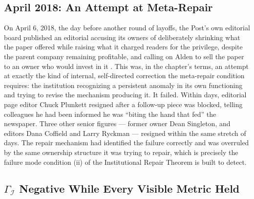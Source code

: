 \documentclass[12pt,twoside,openright]{book}
\begin{document}
\subsection{April 2018: An Attempt at Meta-Repair}

On April 6, 2018, the day before another round of layoffs, the
Post's own editorial board published an editorial accusing its
owners of deliberately shrinking what the paper offered while
raising what it charged readers for the privilege, despite the
parent company remaining profitable, and calling on Alden to
sell the paper to an owner who would invest in it
\parencite{npr2018denverpost}. This was, in the chapter's terms, an
attempt at exactly the kind of internal, self-directed correction
the meta-repair condition requires: the institution recognizing
a persistent anomaly in its own functioning and trying to revise
the mechanism producing it. It failed. Within days, editorial
page editor Chuck Plunkett resigned after a follow-up piece was
blocked, telling colleagues he had been informed he was
``biting the hand that fed'' the newspaper. Three other senior
figures --- former owner Dean Singleton, and editors Dana
Coffield and Larry Ryckman --- resigned within the same stretch
of days. The repair mechanism had identified the failure
correctly and was overruled by the same ownership structure it
was trying to repair, which is precisely the failure mode
condition (ii) of the Institutional Repair Theorem is built to
detect.

\subsection{\texorpdfstring{$\Gamma_\mathcal{I}$}{Gamma\_I} Negative While Every Visible Metric Held}
\end{document}
